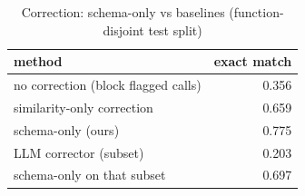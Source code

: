 \begin{table}[t]
\centering
\caption{Correction: schema-only vs baselines (function-disjoint test split)}
\label{tab:baselines_correction_function_disjoint}
\begin{tabular}{lr}
\hline
method & exact match \\
\hline
no correction (block flagged calls) & 0.356 \\
similarity-only correction & 0.659 \\
schema-only (ours) & 0.775 \\
LLM corrector (subset) & 0.203 \\
schema-only on that subset & 0.697 \\
\hline
\end{tabular}
\end{table}

